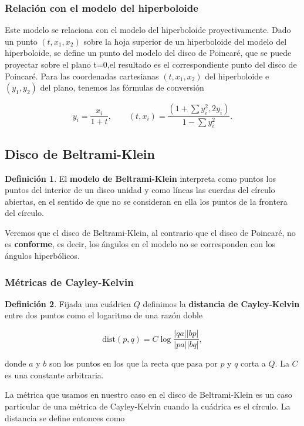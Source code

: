 \documentclass{article}
\theoremstyle{plain}
\theoremstyle{definition}
\newtheorem{definition}{Definición}
\theoremstyle{remark}
\begin{document}
\subsubsection{Relación con el modelo del hiperboloide}
Este modelo se relaciona con el modelo del hiperboloide
proyectivamente. Dado un punto $(t, x_1,x_2)$ sobre la hoja superior
de un hiperboloide del modelo del hiperboloide, se define un punto del
modelo del disco de Poincaré, que se puede proyectar sobre el plano
t=0,el resultado es el correspondiente punto del disco de Poincaré.
Para las coordenadas cartesianas $(t,x_1,x_2)$ del hiperboloide e
$(y_1,y_2)$ del plano, tenemos las fórmulas de conversión

\[
  y_{i}=\frac {x_{i}}{1+t},
  \qquad
  (t,x_{i})=\frac {(1+\sum {y_{i}^{2}},2y_{i})}{1-\sum {y_{i}^{2}}}.
\]


\subsection{Disco de Beltrami-Klein}

\begin{definition}
  El \textbf{modelo de Beltrami-Klein} interpreta como puntos los puntos
  del interior de un disco unidad y como líneas las cuerdas del círculo
  abiertas, en el sentido de que no se consideran en ella los puntos de
  la frontera del círculo.
\end{definition}

Veremos que el disco de Beltrami-Klein, al contrario que el disco de
Poincaré, no es \textbf{conforme}, es decir, los ángulos en el modelo
no se corresponden con los ángulos hiperbólicos.

\subsubsection{Métricas de Cayley-Kelvin}
\begin{definition}
  Fijada una cuádrica $Q$ definimos la \textbf{distancia de Cayley-Kelvin}
  entre dos puntos como el logaritmo de una razón doble

  \[
    \mathrm{dist}(p,q) = C\log\frac{|qa||bp|}{|pa||bq|},
  \]

  donde $a$ y $b$ son los puntos en los que la recta que pasa por $p$
  y $q$ corta a $Q$. La $C$ es una constante arbitraria.
\end{definition}

La métrica que usamos en nuestro caso en el disco de Beltrami-Klein es
un caso particular de una métrica de Cayley-Kelvin cuando la cuádrica
es el círculo. La distancia se define entonces como
\end{document}
